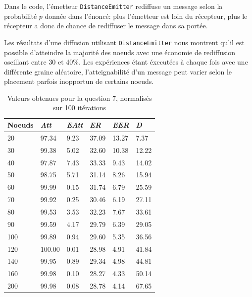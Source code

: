 \documentclass[a4paper]{article}
\begin{document}
\begin{minipage}{0.5\textwidth}
Dans le code, l'émetteur \texttt{DistanceEmitter} rediffuse un message
selon la probabilité $p$ donnée dans l'énoncé: plus l'émetteur est
loin du récepteur, plus le récepteur a donc de chance de rediffuser le
message dans sa portée.

Les résultats d'une diffusion utilisant \texttt{DistanceEmitter} nous
montrent qu'il est possible d'atteindre la majorité des noeuds avec
une économie de rediffusion oscillant entre 30 et 40\%. Les
expériences étant éxecutées à chaque fois avec une différente graine
aléatoire, l'atteignabilité d'un message peut varier selon le
placement parfois inopportun de certains noeuds.
\end{minipage}
\hfill
\begin{minipage}{0.4\textwidth}
  \begin{table}[H]
    \begin{tabular}{|l|l|l|l|l|l|}
      \hline
Noeuds &\textsl{Att} & \textsl{EAtt} & \textsl{ER} & \textsl{EER} &
\textsl{D} \\ \hline
20 & 97.34 & 9.23 & 37.09 & 13.27 & 7.37 \\ \hline
30 & 99.38 & 5.02 & 32.60 & 10.38 & 12.22 \\ \hline
40 & 97.87 & 7.43 & 33.33 & 9.43 & 14.02 \\ \hline
50 & 98.75 & 5.71 & 31.14 & 8.26 & 15.94 \\ \hline
60 & 99.99 & 0.15 & 31.74 & 6.79 & 25.59 \\ \hline
70 & 99.92 & 0.25 & 30.46 & 6.19 & 27.11 \\ \hline
80 & 99.53 & 3.53 & 32.23 & 7.67 & 33.61 \\ \hline
90 & 99.59 & 4.17 & 29.79 & 6.39 & 29.05 \\ \hline
100 & 99.89 & 0.94 & 29.60 & 5.35 & 36.56 \\ \hline
120 & 100.00 & 0.01 & 28.98 & 4.91 & 41.84 \\ \hline
140 & 99.95 & 0.89 & 29.34 & 4.98 & 44.81 \\ \hline
160 & 99.98 & 0.10 & 28.27 & 4.33 & 50.14 \\ \hline
200 & 99.98 & 0.08 & 28.78 & 4.14 & 67.65 \\ \hline
    \end{tabular}
    \caption{Valeurs obtenues pour la question 7, normalisés sur 100 itérations}
  \end{table}

\end{minipage}
\end{document}
